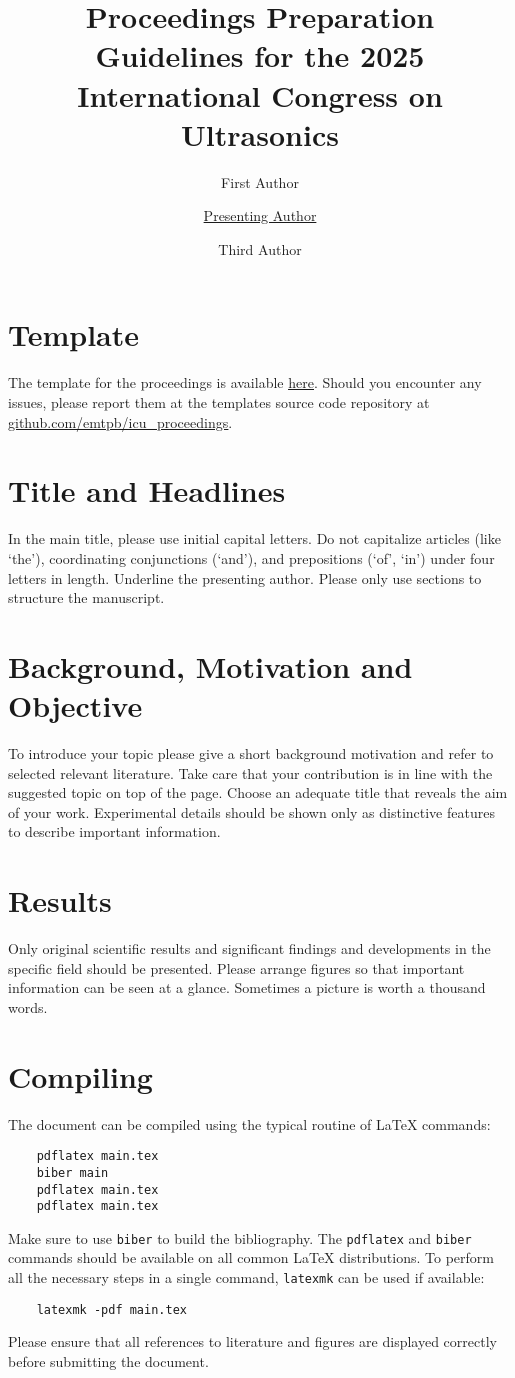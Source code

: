 \documentclass{ama}
\title{Proceedings Preparation Guidelines for the 2025 International Congress on Ultrasonics}
\author[1]{First Author}
\author[1]{\underline{Presenting Author}}
\author[2]{Third Author}
\affil[1]{Institution or company, address and country}
\affil[2]{Institution or company, address and country}
\begin{document}
\section{Template}
The template for the proceedings is available \href{https://github.com/emtpb/icu_proceedings/archive/refs/heads/main.zip}{\underline{here}}.
Should you encounter any issues, please report them at the templates source code repository at \href{https://github.com/emtpb/icu_proceedings}{\underline{github.com/emtpb/icu\_proceedings}}.

\section{Title and Headlines}
In the main title, please use initial capital letters.
Do not capitalize articles (like `the'), coordinating conjunctions (`and'), and prepositions (`of', `in') under four letters in length.
Underline the presenting author.
Please only use sections to structure the manuscript.

\section{Background, Motivation and Objective}
To introduce your topic please give a short background motivation and refer to selected relevant literature.
Take care that your contribution is in line with the suggested topic on top of the page.
Choose an adequate title that reveals the aim of your work.
Experimental details should be shown only as distinctive features to describe important information.

\section{Results}
Only original scientific results and significant findings and developments in the specific field should be presented.
Please arrange figures so that important information can be seen at a glance.
Sometimes a picture is worth a thousand words.

\section{Compiling}
The document can be compiled using the typical routine of \LaTeX{} commands:
%
\begin{verbatim}
    pdflatex main.tex
    biber main
    pdflatex main.tex
    pdflatex main.tex
\end{verbatim}
%
Make sure to use \texttt{biber} to build the bibliography.
The \texttt{pdflatex} and \texttt{biber} commands should be available on all common \LaTeX{} distributions.
To perform all the necessary steps in a single command, \texttt{latexmk} can be used if available:
%
\begin{verbatim}
    latexmk -pdf main.tex
\end{verbatim}
%
Please ensure that all references to literature and figures are displayed correctly before submitting the document.
\end{document}
